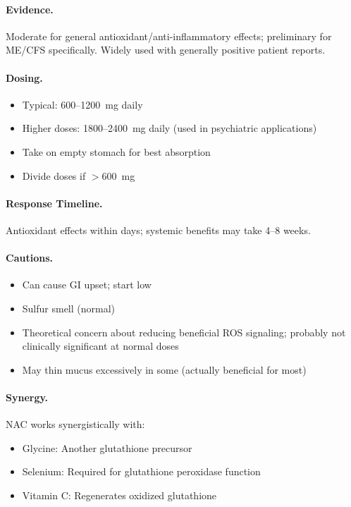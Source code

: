 \paragraph{Evidence.} Moderate for general antioxidant/anti-inflammatory effects; preliminary for ME/CFS specifically. Widely used with generally positive patient reports.

\paragraph{Dosing.}
\begin{itemize}
    \item Typical: 600--1200~mg daily
    \item Higher doses: 1800--2400~mg daily (used in psychiatric applications)
    \item Take on empty stomach for best absorption
    \item Divide doses if $>$600~mg
\end{itemize}

\paragraph{Response Timeline.} Antioxidant effects within days; systemic benefits may take 4--8 weeks.

\paragraph{Cautions.}
\begin{itemize}
    \item Can cause GI upset; start low
    \item Sulfur smell (normal)
    \item Theoretical concern about reducing beneficial ROS signaling; probably not clinically significant at normal doses
    \item May thin mucus excessively in some (actually beneficial for most)
\end{itemize}

\paragraph{Synergy.} NAC works synergistically with:
\begin{itemize}
    \item Glycine: Another glutathione precursor
    \item Selenium: Required for glutathione peroxidase function
    \item Vitamin C: Regenerates oxidized glutathione
\end{itemize}


